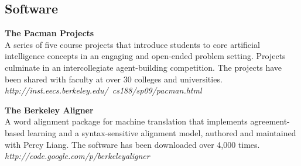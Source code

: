 \documentclass[margin,line]{res}
\begin{document}
\begin{resume}
\section{\sc Software}

{\bf The Pacman Projects} \\
A series of five course projects that introduce students to core artificial
intelligence concepts in an engaging and open-ended problem setting. Projects
culminate in an intercollegiate agent-building competition. The projects have
been shared with faculty at over 30 colleges and universities.\\
{\it http://inst.eecs.berkeley.edu/~cs188/sp09/pacman.html }

{\bf The Berkeley Aligner } \\
A word alignment package for machine translation that implements agreement-based
learning and a syntax-sensitive alignment model, authored and maintained with
Percy Liang. The software has been downloaded over 4,000 times. \\
{\it http://code.google.com/p/berkeleyaligner }

\end{resume}
\end{document}
